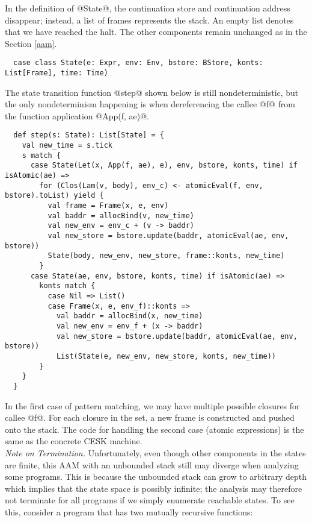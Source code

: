 \documentclass[acmsmall, review]{acmart}\settopmatter{}
\begin{document}
In the definition of @State@, the continuation store and continuation address disappear;
instead, a list of frames represents the stack. An empty list denotes that we have reached 
the halt. The other components remain unchanged as in the Section \ref{aam}.

\begin{lstlisting}
  case class State(e: Expr, env: Env, bstore: BStore, konts: List[Frame], time: Time)
\end{lstlisting}

The state transition function @step@ shown below is still nondeterministic, but the only 
nondeterminism happening is when dereferencing the callee @f@ from the function application 
@App(f, ae)@.

\begin{lstlisting}
  def step(s: State): List[State] = {
    val new_time = s.tick
    s match {
      case State(Let(x, App(f, ae), e), env, bstore, konts, time) if isAtomic(ae) =>
        for (Clos(Lam(v, body), env_c) <- atomicEval(f, env, bstore).toList) yield {
          val frame = Frame(x, e, env)
          val baddr = allocBind(v, new_time)
          val new_env = env_c + (v -> baddr)
          val new_store = bstore.update(baddr, atomicEval(ae, env, bstore))
          State(body, new_env, new_store, frame::konts, new_time)
        }
      case State(ae, env, bstore, konts, time) if isAtomic(ae) =>
        konts match {
          case Nil => List()
          case Frame(x, e, env_f)::konts =>
            val baddr = allocBind(x, new_time)
            val new_env = env_f + (x -> baddr)
            val new_store = bstore.update(baddr, atomicEval(ae, env, bstore))
            List(State(e, new_env, new_store, konts, new_time))
        }
    }
  }
\end{lstlisting}

In the first case of pattern matching, we may have multiple possible closures for callee @f@.
For each closure in the set, a new frame is constructed and pushed onto the stack.
The code for handling the second case (atomic expressions) is the same as the concrete CESK machine. \\

\textit{Note on Termination.}
Unfortunately, even though other components in the states are finite, this AAM with an unbounded
stack still may diverge when analyzing some programs.
This is because the unbounded stack can grow to arbitrary depth which implies that the state
space is possibly infinite; the analysis may therefore not terminate for all programs if we
simply enumerate reachable states. To see this, consider a program that has two mutually
recursive functions:
\end{document}
